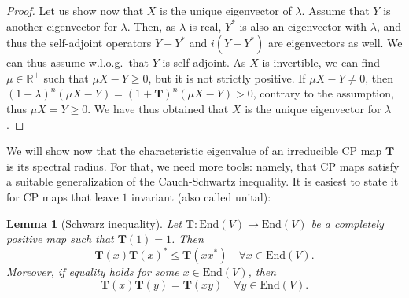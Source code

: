 \documentclass{article}
\newtheorem{lemma}{Lemma}
\newcommand{\End}{\mathrm{End}}
\begin{document}
\begin{proof}
  Let us show now that $X$ is the unique eigenvector of $\lambda$. Assume that $Y$ is another eigenvector for $\lambda$. Then, as $\lambda$ is real, $Y^*$ is also an eigenvector with $\lambda$, and thus the self-adjoint operators $Y+Y^*$ and $i(Y-Y^*)$ are eigenvectors as well. We can thus assume w.l.o.g.\ that $Y$ is self-adjoint. As $X$ is invertible, we can find $\mu\in \mathbb{R}^+$ such that $\mu X-Y \geq 0$, but it is not strictly positive. If $\mu X-Y\neq 0$, then $(1+\lambda)^n(\mu X - Y) = (1+\mathbf{T})^n(\mu X - Y)> 0$, contrary to the assumption, thus $\mu X = Y \geq 0$. We have thus obtained that $X$ is the unique eigenvector for $\lambda$.
\end{proof}




We will show now that the characteristic eigenvalue of an irreducible CP map $\mathbf{T}$ is its spectral radius. For that, we need more tools: namely, that CP maps satisfy a suitable generalization of the Cauch-Schwartz inequality. It is easiest to state it for CP maps that leave $1$ invariant (also called unital):
\begin{lemma}[Schwarz inequality]\label{lem:Schwarz}
  Let $\mathbf{T}:\End(V) \to \End(V)$ be a completely positive map such that $\mathbf{T}(1)=1$. Then 
  \begin{equation*}
    \mathbf{T}(x) \mathbf{T}(x)^* \leq \mathbf{T}(xx^*) \quad \forall x\in\End(V).
  \end{equation*}
  Moreover, if equality holds for some $x\in\End(V)$, then 
  \begin{equation*}
    \mathbf{T}(x) \mathbf{T}(y) = \mathbf{T}(xy)  \quad \forall y\in\End(V).
  \end{equation*}
\end{lemma}
\end{document}
